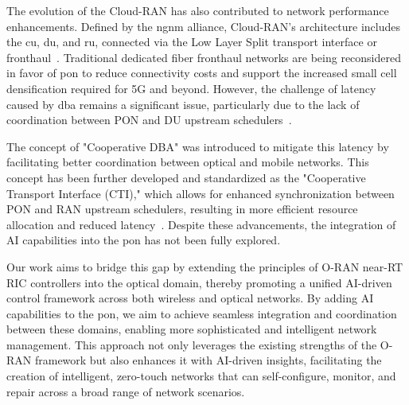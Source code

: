 The evolution of the Cloud-RAN has also contributed to network performance enhancements. Defined by the \ac{ngnm} alliance, Cloud-RAN's architecture includes the \ac{cu}, \ac{du}, and \ac{ru}, connected via the Low Layer Split transport interface or fronthaul~\cite{das2019variable}. Traditional dedicated fiber fronthaul networks are being reconsidered in favor of \ac{pon} to reduce connectivity costs and support the increased small cell densification required for 5G and beyond. However, the challenge of latency caused by \ac{dba} remains a significant issue, particularly due to the lack of coordination between PON and DU upstream schedulers~\cite{slyne2024demonstration}.

The concept of "Cooperative DBA" was introduced to mitigate this latency by facilitating better coordination between optical and mobile networks. This concept has been further developed and standardized as the "Cooperative Transport Interface (CTI)," which allows for enhanced synchronization between PON and RAN upstream schedulers, resulting in more efficient resource allocation and reduced latency~\cite{nomura2017first}. Despite these advancements, the integration of AI capabilities into the \ac{pon} has not been fully explored.

Our work aims to bridge this gap by extending the principles of O-RAN near-RT RIC controllers into the optical domain, thereby promoting a unified AI-driven control framework across both wireless and optical networks. By adding AI capabilities to the \ac{pon}, we aim to achieve seamless integration and coordination between these domains, enabling more sophisticated and intelligent network management. This approach not only leverages the existing strengths of the O-RAN framework but also enhances it with AI-driven insights, facilitating the creation of intelligent, zero-touch networks that can self-configure, monitor, and repair across a broad range of network scenarios.

